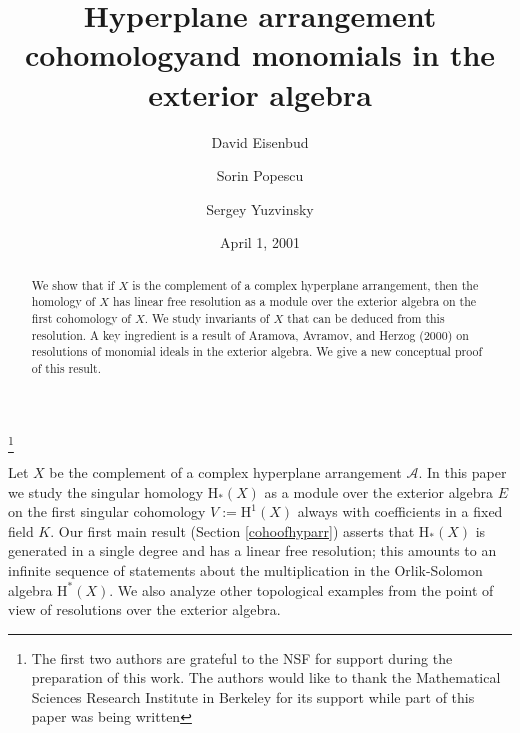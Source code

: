 \documentclass{tran-l}
\theoremstyle{definition}
\theoremstyle{remark}
\newcommand{\Acal}{{{\mathcal A}}}
\newcommand{\rH}{{\mathrm H}}
\begin{document}
\title[Hyperplane Arrangement Cohomology and Monomials]{Hyperplane arrangement
cohomology\linebreak[1] and monomials in the exterior algebra}

\author{David Eisenbud}
\address{Department of Mathematics, University of California Berkeley, 
Berkeley, California 94720}
\thanks{The first two authors are grateful to the NSF for 
support during the preparation of this work. The authors would like 
to thank the Mathematical Sciences Research Institute in Berkeley 
for its support while part of this paper was being written}


\author{Sorin Popescu}
\address{Department of Mathematics, SUNY at Stony Brook,  
Stony Brook, New York 11794}

\author{Sergey Yuzvinsky}
\address{Department of Mathematics, University of Oregon, 
Eugene, Oregon 97403}

\date{April 1, 2001}

\begin{abstract}
We show that if $X$ is the complement of a complex hyperplane
arrangement, then the homology of $X$ has linear free resolution as
a module over the exterior algebra on the first cohomology of $X$.
We study invariants of $X$ that can be deduced from this resolution.
A key ingredient is a result of Aramova, Avramov, and Herzog (2000) on
resolutions of monomial ideals in the exterior algebra. We
give a new conceptual proof of this result.
\end{abstract}

\maketitle

Let $X$ be the complement of a complex hyperplane arrangement $\Acal$.
In this paper we study the singular homology $\rH_*(X)$ as a module
over the exterior algebra $E$ on the first singular cohomology
$V:=\rH^1(X)$ always with coefficients in a fixed field $K$.  Our first
main result (Section \ref{cohoofhyparr}) asserts that $\rH_*(X)$ is
generated in a single degree and has a linear free resolution; this
amounts to an infinite sequence of statements about
the multiplication in the Orlik-Solomon algebra
$\rH^*(X)$. We also analyze other topological examples from the  
point of view of resolutions over the exterior algebra.
\end{document}
